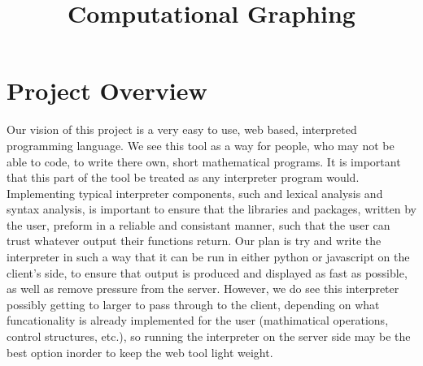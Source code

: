 \documentclass{article}
\title{Computational Graphing}
\begin{document}
    \newcommand{\titleimage}{compiax.png}
    
    
    
	

	\newpage

	\section{Project Overview}

	Our vision of this project is a very easy to use, web based, interpreted programming language. We see this tool as a way for people, 
    who may not be able to code, to write there own, short mathematical programs. It is important that this part of the tool be treated as
    any interpreter program would. Implementing typical interpreter components, such and lexical analysis and syntax analysis, is important
    to ensure that the libraries and packages, written by the user, preform in a reliable and consistant manner, such that the user can 
    trust whatever output their functions return. Our plan is try and write the interpreter in such a way that it can be run in either python
    or javascript on the client's side, to ensure that output is produced and displayed as fast as possible, as well as remove pressure 
    from the server. However, we do see this interpreter possibly getting to larger to pass through to the client, depending on what 
    funcationality is already implemented for the user (mathimatical operations, control structures, etc.), so running the interpreter on the
    server side may be the best option inorder to keep the web tool light weight. \par
\end{document}

